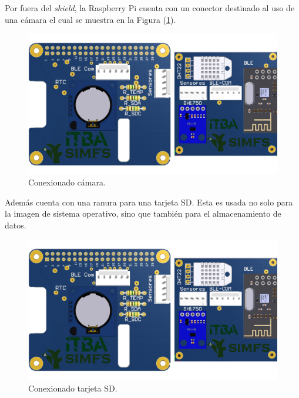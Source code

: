 Por fuera del \textit{shield}, la Raspberry Pi cuenta con un conector destinado al uso de una cámara el cual se muestra en la Figura (\ref{fig:rpiFront}).
\begin{figure}[H]
	\centering
	\includegraphics[width=\linewidth,page=3]{ImagenesIngenieria de Detalle/RPI}		
	\caption{Conexionado cámara.}
	\label{fig:rpiFront}
\end{figure}

Además cuenta con una ranura para una tarjeta SD. Esta es usada no solo para la imagen de sistema operativo, sino que también para el almacenamiento de datos.
\begin{figure}[H]
	\centering
	\includegraphics[width=0.9\linewidth,page=2]{ImagenesIngenieria de Detalle/RPI}		
	\caption{Conexionado tarjeta SD.}
	\label{fig:rpiBack}
\end{figure}

